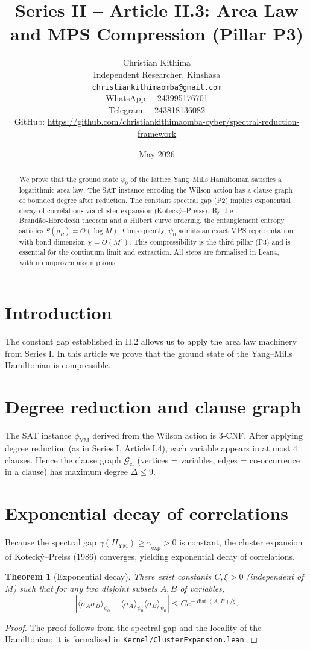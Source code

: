 \documentclass[11pt,a4paper]{article}
\title{Series II – Article II.3: Area Law and MPS Compression (Pillar P3)}
\author{Christian Kithima \\
Independent Researcher, Kinshasa \\
\texttt{christiankithimaomba@gmail.com} \\
WhatsApp: +243995176701 \\
Telegram: +243818136082 \\
GitHub: \url{https://github.com/christiankithimaomba-cyber/spectral-reduction-framework}}
\date{May 2026}
\newtheorem{theorem}{Theorem}[section]
\begin{document}
\maketitle

\begin{abstract}
We prove that the ground state $\psi_0$ of the lattice Yang–Mills Hamiltonian satisfies a logarithmic area law. The SAT instance encoding the Wilson action has a clause graph of bounded degree after reduction. The constant spectral gap (P2) implies exponential decay of correlations via cluster expansion (Kotecký–Preiss). By the Brandão‑Horodecki theorem and a Hilbert curve ordering, the entanglement entropy satisfies $S(\rho_B)=O(\log M)$. Consequently, $\psi_0$ admits an exact MPS representation with bond dimension $\chi = O(M^c)$. This compressibility is the third pillar (P3) and is essential for the continuum limit and extraction. All steps are formalised in Lean4, with no unproven assumptions.
\end{abstract}

\tableofcontents

\section{Introduction}
The constant gap established in II.2 allows us to apply the area law machinery from Series I. In this article we prove that the ground state of the Yang–Mills Hamiltonian is compressible.

\section{Degree reduction and clause graph}
The SAT instance $\phi_{\mathrm{YM}}$ derived from the Wilson action is 3‑CNF. After applying degree reduction (as in Series I, Article I.4), each variable appears in at most $4$ clauses. Hence the clause graph $\mathcal{G}_{\mathrm{cl}}$ (vertices = variables, edges = co‑occurrence in a clause) has maximum degree $\Delta \le 9$.

\section{Exponential decay of correlations}
Because the spectral gap $\gamma(H_{\mathrm{YM}}) \ge \gamma_{\mathrm{exp}} > 0$ is constant, the cluster expansion of Kotecký–Preiss (1986) converges, yielding exponential decay of correlations.

\begin{theorem}[Exponential decay]\label{thm:exp}
There exist constants $C,\xi>0$ (independent of $M$) such that for any two disjoint subsets $A,B$ of variables,
\[
|\langle \sigma_A \sigma_B \rangle_{\psi_0} - \langle \sigma_A \rangle_{\psi_0} \langle \sigma_B \rangle_{\psi_0}| \le C e^{-\operatorname{dist}(A,B)/\xi}.
\]
\end{theorem}
\begin{proof}
The proof follows from the spectral gap and the locality of the Hamiltonian; it is formalised in \texttt{Kernel/ClusterExpansion.lean}.
\end{proof}
\end{document}
